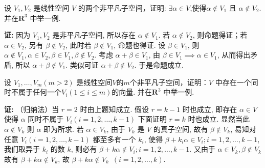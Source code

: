 \begin{exercise}
\begin{exgroup}
        \item 设 $V_1,V_2$ 是线性空间 $V$ 的两个非平凡子空间，证明: $\exists \alpha \in V$,使得$\alpha \notin V_1$ 且 $\alpha \notin V_2$. 并在$\mathbf{R}^3$ 中举一例.
        \begin{answer}
            \textbf{证:} 因为 $V_1, V_2$ 是非平凡子空间, 所以存在 $\alpha \notin V_1$. 若 $\alpha \notin V_2$, 则命题得证；若 $\alpha \in V_2$, 另有 $\beta \notin V_2$, 此时若 $\beta \notin V_1$, 命题也得证. 设 $\beta \in V_1$, 则 $\alpha \notin V_1, \alpha \in V_2, \beta \in V_1, \beta \notin V_2$.
            考虑 $\alpha + \beta \in V_1$, 由 $\beta \in V_1 \implies \alpha \in V_1$, 从而得出矛盾, 所以 $\alpha + \beta \notin V_1$. 类似可证 $\alpha + \beta \notin V_2$. 于是命题成立.
        \end{answer}
        \item 设 $V_1,\ldots,V_m (m > 2)$ 是线性空间$V$的$m$个非平凡子空间，证明：$V$ 中存在一个同时不属于任何一个$V_i(1 \leqslant i \leqslant m)$的向量. 并在$\mathbf{R}^3$ 中举一例.
        \begin{answer}\label{eg:4:A:5}
          \textbf{证:} （归纳法）当 $r=2$ 时由上题知成立.
          假设 $r = k-1$ 时也成立, 即存在 $\alpha \in V$
          使得 $\alpha$ 同时不属于 $V_i (i=1,2,\ldots,k-1)$
          下面证明 $r=k$ 时也成立. 显然当此 $\alpha \notin V_k$ 则 $\alpha$ 即为所求.
           若 $\alpha \in V_k$, 由于 $V_k$ 是 $V$ 的真子空间, 故有 $\beta \notin V_k$, 易知对任意 $V_i (i=1,2,\ldots,k-1)$ 都至多有一个 $k_i$, 使得 $\beta + k_i \alpha \in V_i; i=1,2,\ldots,k-1$, 我们取异于 $k_i$ 的数 $k$, 则必有 $\beta + k \alpha \notin V_i; i=1,2,\ldots,k-1$. 又由于 $\alpha \in V_k, \beta \notin V_k$ 故有 $\beta + k \alpha \notin V_k$, 故 $\beta + k \alpha \notin V_k \enspace (i = 1,2,\ldots,k)$.
        \end{answer}
    \end{exgroup}


\end{exercise}
